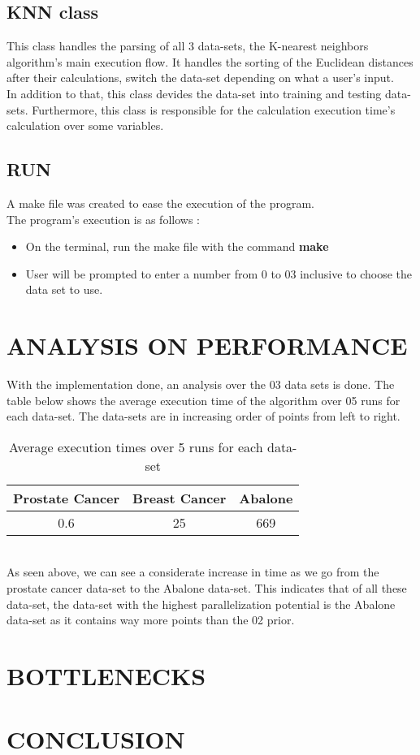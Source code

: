 \documentclass[conference]{IEEEtran}
\begin{document}
\subsection{ KNN class }
This class handles the parsing of all 3 data-sets, the K-nearest neighbors algorithm's main execution flow. It handles the sorting of the Euclidean distances after their calculations, switch the data-set depending on what a user's input. \\
In addition to that, this class devides the data-set into training and testing data-sets.
Furthermore, this class is responsible for the calculation execution time's calculation over some variables. 
\subsection{ RUN }
A make file was created to ease the execution of the program.  \\
The program's execution is as follows : \\
\begin{itemize}
    \item On the terminal, run the make file with the command \textbf{make} 
    \item User will be prompted to enter a number from 0 to 03 inclusive to choose the data set to use. 
\end{itemize}
\section{ANALYSIS ON PERFORMANCE}
With the implementation done, an analysis over the 03 data sets is done. The table below shows the average execution time of the algorithm over 05 runs for each data-set. The data-sets are in increasing order of points from left to right.
\begin{table}[h!]
\centering
 \begin{tabular}{||c c c||} 
 \hline
 Prostate Cancer & Breast Cancer  & Abalone \\ [0.5ex] 
 \hline\hline
 0.6 & 25 & 669  \\ [1ex] 
 \hline
 \end{tabular}
 \caption{Average execution times over 5 runs for each data-set}
\label{table:1}
\end{table} \\
As seen above, we can see a considerate increase in time as we go from the prostate cancer data-set to the Abalone data-set. This indicates that of all these data-set, the data-set with the highest parallelization potential is the Abalone data-set as it contains way more points than the 02 prior.
\section{ BOTTLENECKS}
\section{CONCLUSION}


\end{document}
